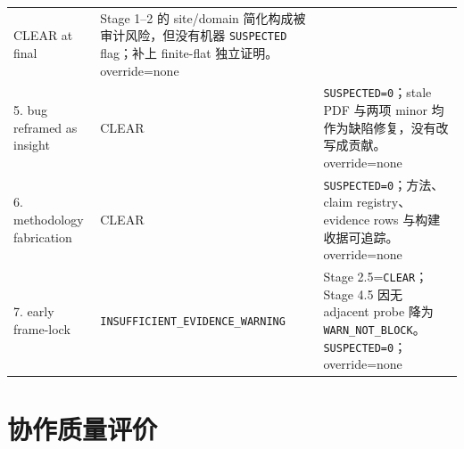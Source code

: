 \documentclass[12pt,a4paper]{article}
\begin{document}
\begin{longtable}[]{@{}lll@{}}
\begin{minipage}[t]{0.30\columnwidth}
CLEAR at final\strut
\end{minipage} & \begin{minipage}[t]{0.30\columnwidth}\raggedright
Stage 1--2 的 site/domain 简化构成被审计风险，但没有机器
\texttt{SUSPECTED} flag；补上 finite-flat 独立证明。override=none\strut
\end{minipage}\tabularnewline
\begin{minipage}[t]{0.30\columnwidth}\raggedright
5. bug reframed as insight\strut
\end{minipage} & \begin{minipage}[t]{0.30\columnwidth}\raggedright
CLEAR\strut
\end{minipage} & \begin{minipage}[t]{0.30\columnwidth}\raggedright
\texttt{SUSPECTED=0}；stale PDF 与两项 minor
均作为缺陷修复，没有改写成贡献。override=none\strut
\end{minipage}\tabularnewline
\begin{minipage}[t]{0.30\columnwidth}\raggedright
6. methodology fabrication\strut
\end{minipage} & \begin{minipage}[t]{0.30\columnwidth}\raggedright
CLEAR\strut
\end{minipage} & \begin{minipage}[t]{0.30\columnwidth}\raggedright
\texttt{SUSPECTED=0}；方法、claim registry、evidence rows
与构建收据可追踪。override=none\strut
\end{minipage}\tabularnewline
\begin{minipage}[t]{0.30\columnwidth}\raggedright
7. early frame-lock\strut
\end{minipage} & \begin{minipage}[t]{0.30\columnwidth}\raggedright
\texttt{INSUFFICIENT\_}\hspace{0pt}\texttt{EVIDENCE\_WARNING}\strut
\end{minipage} & \begin{minipage}[t]{0.30\columnwidth}\raggedright
Stage 2.5=\texttt{CLEAR}；Stage 4.5 因无 adjacent probe 降为
\texttt{WARN\_NOT\_BLOCK}。\newline \texttt{SUSPECTED=0}；\newline override=none\strut
\end{minipage}\tabularnewline
\bottomrule
\end{longtable}

\hypertarget{ux534fux4f5cux8d28ux91cfux8bc4ux4ef7}{%
\section{协作质量评价}\label{ux534fux4f5cux8d28ux91cfux8bc4ux4ef7}}
\end{document}
